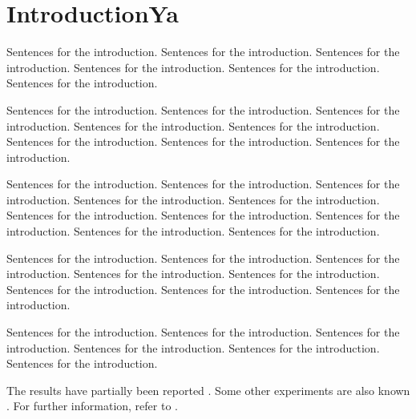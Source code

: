 \chapter{IntroductionYa}

Sentences for the introduction.  Sentences for the introduction.
Sentences for the introduction.  Sentences for the introduction.
Sentences for the introduction.  Sentences for the introduction.

Sentences for the introduction.  Sentences for the introduction.
Sentences for the introduction.  Sentences for the introduction.
Sentences for the introduction.  Sentences for the introduction.
Sentences for the introduction.  Sentences for the introduction.

Sentences for the introduction.  Sentences for the introduction.
Sentences for the introduction.  Sentences for the introduction.
Sentences for the introduction.  Sentences for the introduction.
Sentences for the introduction.  Sentences for the introduction.
Sentences for the introduction.  Sentences for the introduction.

Sentences for the introduction.  Sentences for the introduction.
Sentences for the introduction.  Sentences for the introduction.
Sentences for the introduction.  Sentences for the introduction.
Sentences for the introduction.  Sentences for the introduction.

Sentences for the introduction.  Sentences for the introduction.
Sentences for the introduction.  Sentences for the introduction.
Sentences for the introduction.  Sentences for the introduction.

The results have partially been reported \cite{Boid, 92795}.
Some other experiments are also known \cite{Knuth86, BollenHHJ07}.
For further information, refer to \cite{CI08e, Brush}.


